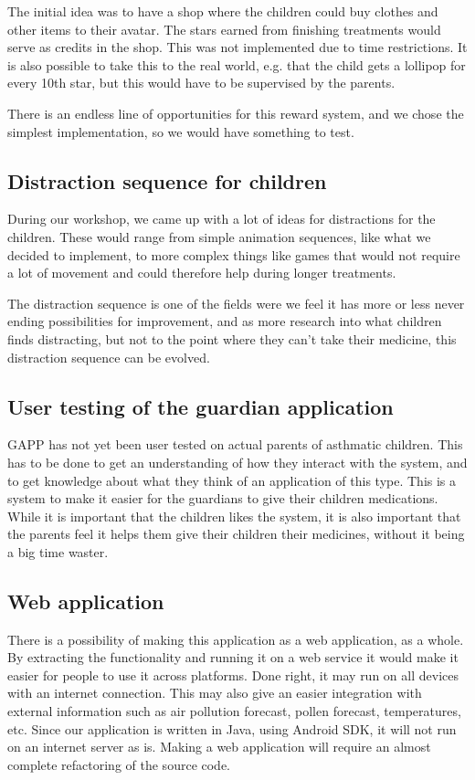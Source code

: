 The initial idea was to have a shop where the children could buy clothes and other items to their avatar. The stars earned from finishing treatments would serve as credits in the shop. This was not implemented due to time restrictions. It is also possible to take this to the real world, e.g. that the child gets a lollipop for every 10th star, but this would have to be supervised by the parents. 
 

There is an endless line of opportunities for this reward system, and we chose the simplest implementation, so we would have something to test. 

\subsection{Distraction sequence for children}
During our workshop, we came up with a lot of ideas for distractions for the children. These would range from simple animation sequences, like what we decided to implement, to more complex 
things like games that would not require a lot of movement and could therefore help during longer treatments. 

The distraction sequence is one of the fields were we feel it has more or less never ending possibilities for improvement, and as more research into what children finds distracting, but not to the point 
where they can't take their medicine, this distraction sequence can be evolved.


\subsection{User testing of the guardian application}
GAPP has not yet been user tested on actual parents of asthmatic children. This has to be done to get an understanding of how they interact with the system, and to get knowledge about what they think of an application of this type. This is a system to make it easier for the guardians to give their children medications. While it is important that the children likes the system, it is also important that the parents feel it helps them give their children their medicines, without it being a big time waster.

\subsection{Web application}
There is a possibility of making this application as a web application, as a whole. By extracting the functionality and running it on a web service it would make it easier for people to use it across platforms. Done right, it may run on all devices with an internet connection. This may also give an easier integration with external information such as air pollution forecast, pollen forecast, temperatures, etc. Since our application is written in Java, using Android SDK, it will not run on an internet server as is. Making a web application will require an almost complete refactoring of the source code.

